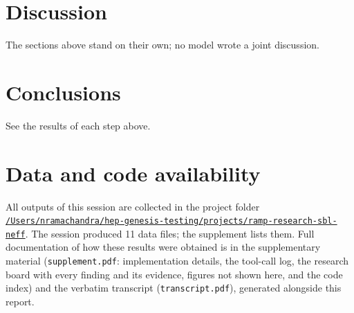 \documentclass[11pt,a4paper]{article}
\begin{document}
\section{Discussion}
The sections above stand on their own; no model wrote a joint discussion.

\section{Conclusions}
See the results of each step above.


\section*{Data and code availability}
All outputs of this session are collected in the project folder \href{file:///Users/nramachandra/hep-genesis-testing/projects/ramp-research-sbl-neff}{\texttt{/\allowbreak{}Users/\allowbreak{}nramachandra/\allowbreak{}hep-genesis-testing/\allowbreak{}projects/\allowbreak{}ramp-research-sbl-neff}}.
The session produced 11 data files; the supplement lists them.
Full documentation of how these results were obtained is in the supplementary material (\texttt{supplement.pdf}: implementation details, the tool-call log, the research board with every finding and its evidence, figures not shown here, and the code index) and the verbatim transcript (\texttt{transcript.pdf}), generated alongside this report.
\end{document}
